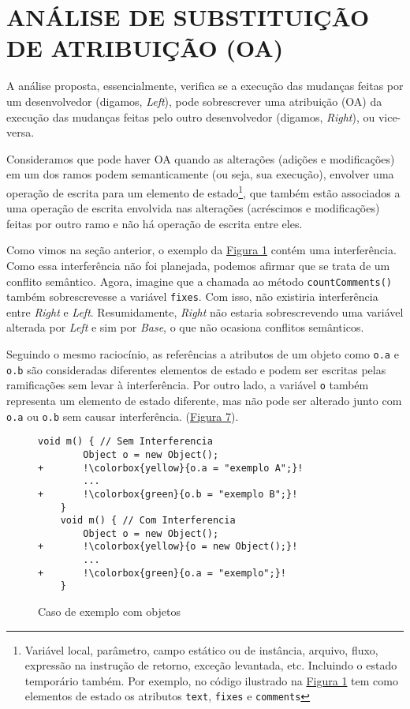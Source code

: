 \section{ANÁLISE DE SUBSTITUIÇÃO DE ATRIBUIÇÃO (OA)}

A análise proposta, essencialmente, verifica se a execução das mudanças feitas por um desenvolvedor (digamos, \emph{Left}), pode sobrescrever uma atribuição (OA) da execução das mudanças feitas pelo outro desenvolvedor (digamos, \emph{Right}), ou vice-versa.

Consideramos que pode haver OA quando as alterações (adições e modificações) em um dos ramos podem semanticamente (ou seja, sua execução), envolver uma operação de escrita para um elemento de estado\footnote{Variável local, parâmetro, campo estático ou de instância, arquivo, fluxo, expressão na instrução de retorno, exceção levantada, etc. Incluindo o estado temporário também. Por exemplo, no código ilustrado na \hyperref[fig:codigo-motivador]{Figura 1} tem como elementos de estado os atributos \texttt{text}, \texttt{fixes} e \texttt{comments}}, que também estão associados a uma operação de escrita envolvida nas alterações (acréscimos e modificações) feitas por outro ramo e não há operação de escrita entre eles. 

Como vimos na seção anterior, o exemplo da \hyperref[fig:codigo-motivador]{Figura 1} contém uma interferência. Como essa interferência não foi planejada, podemos afirmar que se trata de um conflito semântico. Agora, imagine que a chamada ao método \texttt{countComments()} também sobrescrevesse a variável \texttt{fixes}. Com isso, não existiria interferência entre \emph{Right} e \emph{Left}. Resumidamente, \emph{Right} não estaria sobrescrevendo uma variável alterada por \emph{Left} e sim por \emph{Base}, o que não ocasiona conflitos semânticos.

Seguindo o mesmo raciocínio, as referências a atributos de um objeto como \texttt{o.a} e \texttt{o.b} são consideradas diferentes elementos de estado e podem ser escritas pelas ramificações sem levar à interferência. Por outro lado, a variável \texttt{o} também representa um elemento de estado diferente, mas não pode ser alterado junto com \texttt{o.a} ou \texttt{o.b} sem causar interferência. (\hyperref[fig:object-samples]{Figura 7}).


\begin{figure}[h]
    \begin{lstlisting}[escapechar=!]
    void m() { // Sem Interferencia
        Object o = new Object();
+       !\colorbox{yellow}{o.a = "exemplo A";}!
        ...
+       !\colorbox{green}{o.b = "exemplo B";}!
    }
    void m() { // Com Interferencia
        Object o = new Object();
+       !\colorbox{yellow}{o = new Object();}!
        ...
+       !\colorbox{green}{o.a = "exemplo";}!
    }
    \end{lstlisting}
    \caption{Caso de exemplo com objetos}
    \label{fig:object-samples}
\end{figure}

